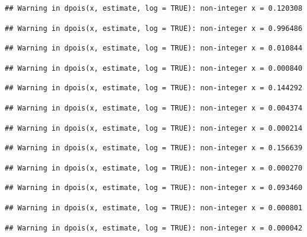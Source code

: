 \documentclass[]{article}
\begin{document}
\begin{verbatim}
## Warning in dpois(x, estimate, log = TRUE): non-integer x = 0.120308
\end{verbatim}

\begin{verbatim}
## Warning in dpois(x, estimate, log = TRUE): non-integer x = 0.996486
\end{verbatim}

\begin{verbatim}
## Warning in dpois(x, estimate, log = TRUE): non-integer x = 0.010844
\end{verbatim}

\begin{verbatim}
## Warning in dpois(x, estimate, log = TRUE): non-integer x = 0.000840
\end{verbatim}

\begin{verbatim}
## Warning in dpois(x, estimate, log = TRUE): non-integer x = 0.144292
\end{verbatim}

\begin{verbatim}
## Warning in dpois(x, estimate, log = TRUE): non-integer x = 0.004374
\end{verbatim}

\begin{verbatim}
## Warning in dpois(x, estimate, log = TRUE): non-integer x = 0.000214
\end{verbatim}

\begin{verbatim}
## Warning in dpois(x, estimate, log = TRUE): non-integer x = 0.156639
\end{verbatim}

\begin{verbatim}
## Warning in dpois(x, estimate, log = TRUE): non-integer x = 0.000270
\end{verbatim}

\begin{verbatim}
## Warning in dpois(x, estimate, log = TRUE): non-integer x = 0.093460
\end{verbatim}

\begin{verbatim}
## Warning in dpois(x, estimate, log = TRUE): non-integer x = 0.000801
\end{verbatim}

\begin{verbatim}
## Warning in dpois(x, estimate, log = TRUE): non-integer x = 0.000042
\end{verbatim}
\end{document}
